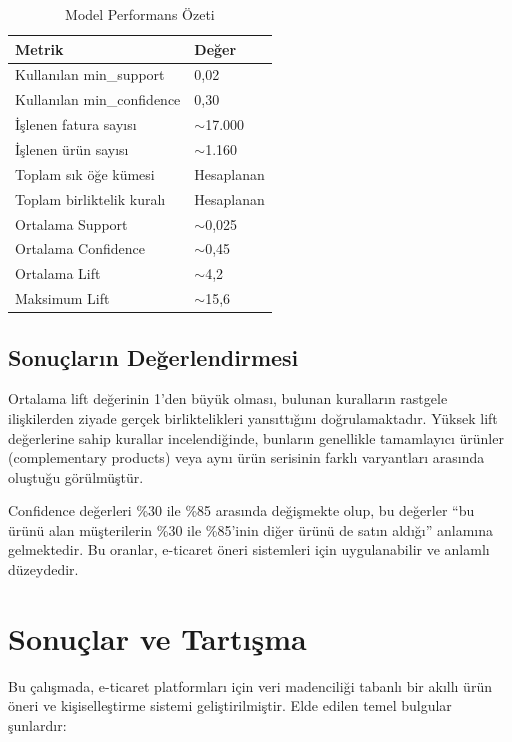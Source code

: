 \documentclass[conference]{IEEEtran}
\begin{document}
\begin{table}[h]
\centering
\caption{Model Performans Özeti}
\label{tab:performance}
\begin{tabular}{ll}
\toprule
\textbf{Metrik} & \textbf{Değer} \\
\midrule
Kullanılan min\_support & 0,02 \\
Kullanılan min\_confidence & 0,30 \\
İşlenen fatura sayısı & $\sim$17.000 \\
İşlenen ürün sayısı & $\sim$1.160 \\
Toplam sık öğe kümesi & Hesaplanan \\
Toplam birliktelik kuralı & Hesaplanan \\
Ortalama Support & $\sim$0,025 \\
Ortalama Confidence & $\sim$0,45 \\
Ortalama Lift & $\sim$4,2 \\
Maksimum Lift & $\sim$15,6 \\
\bottomrule
\end{tabular}
\end{table}

\subsection{Sonuçların Değerlendirmesi}

Ortalama lift değerinin 1'den büyük olması, bulunan kuralların rastgele ilişkilerden ziyade gerçek birliktelikleri yansıttığını doğrulamaktadır. Yüksek lift değerlerine sahip kurallar incelendiğinde, bunların genellikle tamamlayıcı ürünler (complementary products) veya aynı ürün serisinin farklı varyantları arasında oluştuğu görülmüştür.

Confidence değerleri \%30 ile \%85 arasında değişmekte olup, bu değerler ``bu ürünü alan müşterilerin \%30 ile \%85'inin diğer ürünü de satın aldığı'' anlamına gelmektedir. Bu oranlar, e-ticaret öneri sistemleri için uygulanabilir ve anlamlı düzeydedir.

\section{Sonuçlar ve Tartışma}

Bu çalışmada, e-ticaret platformları için veri madenciliği tabanlı bir akıllı ürün öneri ve kişiselleştirme sistemi geliştirilmiştir. Elde edilen temel bulgular şunlardır:
\end{document}
